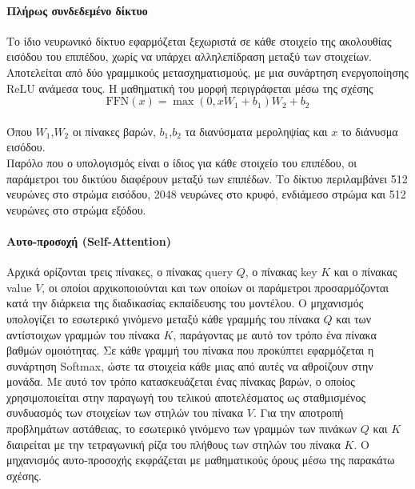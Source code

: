 \documentclass[12pt]{article}
\numberwithin{equation}{section}
\begin{document}
\paragraph{Πλήρως συνδεδεμένο δίκτυο\\[0.5 cm]}

Το ίδιο νευρωνικό δίκτυο εφαρμόζεται ξεχωριστά σε κάθε στοιχείο της ακολουθίας εισόδου του επιπέδου, χωρίς να υπάρχει αλληλεπίδραση μεταξύ των στοιχείων. Αποτελείται από δύο γραμμικούς μετασχηματισμούς, με μια συνάρτηση ενεργοποίησης ReLU ανάμεσα τους. Η μαθηματική του μορφή περιγράφεται μέσω της σχέσης \\ 

\begin{equation}
\text{FFN}(x) = \max(0, xW_1 + b_1)W_2 + b_2
\end{equation}\\

\noindent Όπου \(W_1\),\(W_2\) οι πίνακες βαρών, \(b_1\),\(b_2\) τα διανύσματα μεροληψίας και \(x\) το διάνυσμα εισόδου.\\

\noindent Παρόλο που ο υπολογισμός είναι ο ίδιος για κάθε στοιχείο του επιπέδου, οι παράμετροι του δικτύου διαφέρουν μεταξύ των επιπέδων. Το δίκτυο περιλαμβάνει 512 νευρώνες στο στρώμα εισόδου, 2048 νευρώνες στο κρυφό, ενδιάμεσο στρώμα και 512 νευρώνες στο στρώμα εξόδου. \\

\paragraph{Αυτο-προσοχή (Self-Attention) \\ [0.5 cm]}

Αρχικά ορίζονται τρεις πίνακες, ο πίνακας query \(Q\), ο πίνακας key \(K\) και ο πίνακας value \(V\), οι οποίοι αρχικοποιούνται και των οποίων οι παράμετροι προσαρμόζονται κατά την διάρκεια της διαδικασίας εκπαίδευσης του μοντέλου. Ο μηχανισμός υπολογίζει το εσωτερικό γινόμενο μεταξύ κάθε γραμμής του πίνακα \(Q\) και των αντίστοιχων γραμμών του πίνακα \(K\), παράγοντας με αυτό τον τρόπο ένα πίνακα βαθμών ομοιότητας. Σε κάθε γραμμή του πίνακα που προκύπτει εφαρμόζεται η συνάρτηση Softmax, ώστε τα στοιχεία κάθε μιας από αυτές να αθροίζουν στην μονάδα. Με αυτό τον τρόπο κατασκευάζεται ένας πίνακας βαρών, ο οποίος χρησιμοποιείται στην παραγωγή του τελικού αποτελέσματος ως σταθμισμένος συνδυασμός των στοιχείων των στηλών του πίνακα \(V\). Για την αποτροπή προβλημάτων αστάθειας, το εσωτερικό γινόμενο των γραμμών των πινάκων \(Q\) και \(K\) διαιρείται με την τετραγωνική ρίζα του πλήθους των στηλών του πίνακα \(K\). Ο μηχανισμός αυτο-προσοχής εκφράζεται με μαθηματικούς όρους μέσω της παρακάτω σχέσης. \\
\end{document}
